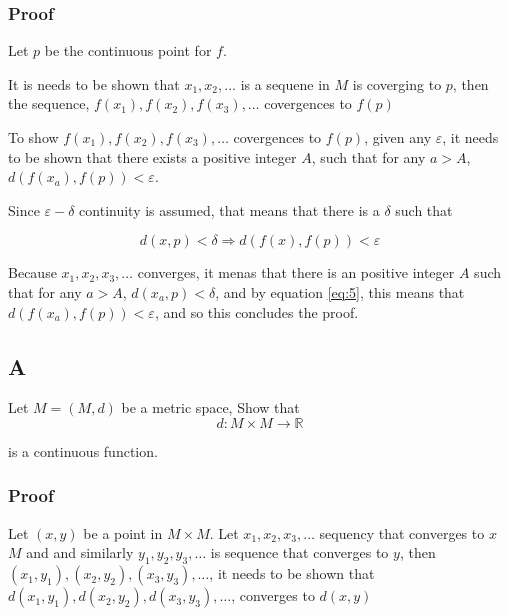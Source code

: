 \documentclass[11pt]{article}
\begin{document}
\subsubsection{Proof}
\label{sec:org6daa9a4}
Let \(p\) be the continuous point for \(f\).

It is needs to be shown that  \(x_1, x_2, \ldots\) is a sequene in \(M\) is
coverging to \(p\), then the sequence, \(f(x_1), f(x_2), f(x_3), \ldots\)
covergences to \(f(p)\)


To show \(f(x_1), f(x_2), f(x_3), \ldots\)
covergences to \(f(p)\), given any \(\varepsilon\), it needs to be shown that there
exists a positive integer \(A\), such that for any \(a > A\), \(d(f(x_a), f(p)) < \varepsilon\).

Since \(\varepsilon -\delta\) continuity is assumed, that means that there is a
\(\delta\) such that

\begin{equation}
\label{eq:5}
d(x, p) < \delta \Rightarrow d(f(x), f(p)) < \varepsilon
\end{equation}

Because \(x_1, x_2, x_3, \ldots\) converges, it menas that there is an
positive integer \(A\) such that for any \(a > A\), \(d(x_{a}, p) < \delta\), and by equation
\ref{eq:5}, this means that \(d(f(x_{a}), f(p)) < \varepsilon\), and so this
concludes the proof.


\subsection{A}
\label{sec:orgd419e59}
Let \(M = (M, d)\) be a metric space, Show that
\begin{equation}
\label{eq:6}
d: M \times M \rightarrow \mathbb{R}
\end{equation}

is a continuous function.

\subsubsection{Proof}
\label{sec:org48c6654}

Let \((x, y)\) be a point in \(M \times M\). Let \(x_1, x_2, x_3, \ldots\)
sequency that converges to \(x\) \(M\) and and similarly \(y_1, y_2, y_3,
\ldots\) is sequence that converges to \(y\), then \((x_{1}, y_1), (x_{2}, y_2),
(x_{3}, y_3), \ldots\),  it needs to be shown that \(d(x_{1}, y_1), d(x_{2}, y_2),
d(x_{3}, y_3), \ldots\), converges to \(d(x, y)\)
\end{document}
